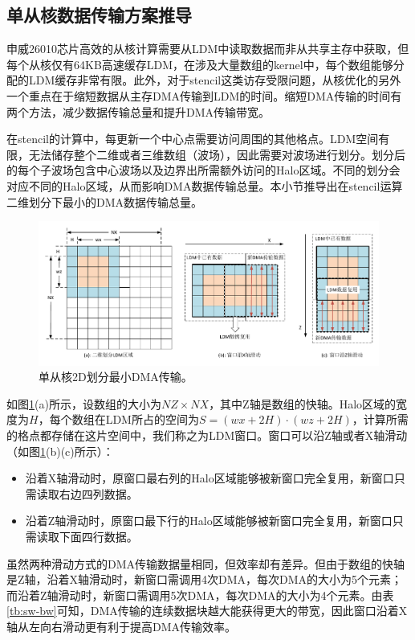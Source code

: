 \documentclass[degree=doctor]{thuthesis}
\begin{document}
\subsection{单从核数据传输方案推导}
申威26010芯片高效的从核计算需要从LDM中读取数据而非从共享主存中获取，但每个从核仅有64KB高速缓存LDM，在涉及大量数组的kernel中，每个数组能够分配的LDM缓存非常有限。此外，对于stencil这类访存受限问题，从核优化的另外一个重点在于缩短数据从主存DMA传输到LDM的时间。缩短DMA传输的时间有两个方法，减少数据传输总量和提升DMA传输带宽。

在stencil的计算中，每更新一个中心点需要访问周围的其他格点。LDM空间有限，无法储存整个二维或者三维数组（波场），因此需要对波场进行划分。划分后的每个子波场包含中心波场以及边界出所需额外访问的Halo区域。不同的划分会对应不同的Halo区域，从而影响DMA数据传输总量。本小节推导出在stencil运算二维划分下最小的DMA数据传输总量。

\begin{figure}[ht]
  \centering
  \includegraphics[width=1.0\columnwidth]{单从核2D划分最小DMA传输.pdf}
  \caption{单从核2D划分最小DMA传输。}
  \label{fig:cpe-2d-derive}
\end{figure}

如图\ref{fig:cpe-2d-derive}(a)所示，设数组的大小为$NZ\times NX$，其中Z轴是数组的快轴。Halo区域的宽度为$H$，每个数组在LDM所占的空间为$S=(wx+2H)\cdot(wz+2H)$，计算所需的格点都存储在这片空间中，我们称之为LDM窗口。窗口可以沿Z轴或者X轴滑动（如图\ref{fig:cpe-2d-derive}(b)(c)所示）：
\begin{itemize}
  \item 沿着X轴滑动时，原窗口最右列的Halo区域能够被新窗口完全复用，新窗口只需读取右边四列数据。
  \item 沿着Z轴滑动时，原窗口最下行的Halo区域能够被新窗口完全复用，新窗口只需读取下面四行数据。
\end{itemize}

虽然两种滑动方式的DMA传输数据量相同，但效率却有差异。但由于数组的快轴是Z轴，沿着X轴滑动时，新窗口需调用4次DMA，每次DMA的大小为5个元素；而沿着Z轴滑动时，新窗口需调用5次DMA，每次DMA的大小为4个元素。由表\ref{tb:sw-bw}可知，DMA传输的连续数据块越大能获得更大的带宽，因此窗口沿着X轴从左向右滑动更有利于提高DMA传输效率。
\end{document}
